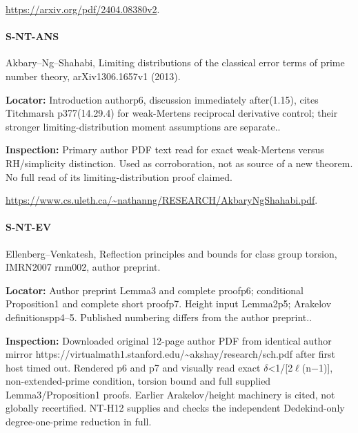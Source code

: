 \documentclass[11pt,a4paper]{article}
\begin{document}
\url{https://arxiv.org/pdf/2404.08380v2}.

\paragraph{S-NT-ANS} Akbary–\allowbreak{}Ng–\allowbreak{}Shahabi, Limiting distributions of the classical error terms of prime number theory, arXiv1306.\allowbreak{}1657v1 (2013).

\textbf{Locator:} Introduction authorp6, discussion immediately after(1.\allowbreak{}15), cites Titchmarsh p377(14.\allowbreak{}29.\allowbreak{}4) for weak-Mertens reciprocal derivative control; their stronger limiting-distribution moment assumptions are separate.\allowbreak{}.

\textbf{Inspection:} Primary author PDF text read for exact weak-Mertens versus RH/\allowbreak{}simplicity distinction.\allowbreak{} Used as corroboration, not as source of a new theorem.\allowbreak{} No full read of its limiting-distribution proof claimed.\allowbreak{}

\url{https://www.cs.uleth.ca/~nathanng/RESEARCH/AkbaryNgShahabi.pdf}.

\paragraph{S-NT-EV} Ellenberg–\allowbreak{}Venkatesh, Reflection principles and bounds for class group torsion, IMRN2007 rnm002, author preprint.

\textbf{Locator:} Author preprint Lemma3 and complete proofp6; conditional Proposition1 and complete short proofp7.\allowbreak{} Height input Lemma2p5; Arakelov definitionspp4–\allowbreak{}5.\allowbreak{} Published numbering differs from the author preprint.\allowbreak{}.

\textbf{Inspection:} Downloaded original 12-page author PDF from identical author mirror https:\allowbreak{}/\allowbreak{}/\allowbreak{}virtualmath1.\allowbreak{}stanford.\allowbreak{}edu/\allowbreak{}\textasciitilde{}akshay/\allowbreak{}research/\allowbreak{}sch.\allowbreak{}pdf after first host timed out.\allowbreak{} Rendered p6 and p7 and visually read exact \ensuremath{\delta}<1/\allowbreak{}[2\ensuremath{\ell}(n\ensuremath{-}1)], non-extended-prime condition, torsion bound and full supplied Lemma3/\allowbreak{}Proposition1 proofs.\allowbreak{} Earlier Arakelov/\allowbreak{}height machinery is cited, not globally recertified.\allowbreak{} NT-H12 supplies and checks the independent Dedekind-only degree-one-prime reduction in full.\allowbreak{}
\end{document}
